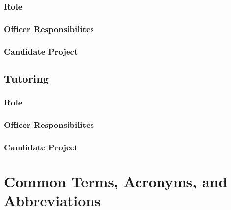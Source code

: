 \documentclass[11pt, article, oneside]{memoir}
\begin{document}
    \subsection{Role}

    \subsection{Officer Responsibilites}

    \subsection{Candidate Project}


    \bigbreak

    
    \section{Tutoring}
    \subsection{Role}

    \subsection{Officer Responsibilites}

    \subsection{Candidate Project}

    
    \bigbreak
    

    \newpage
    \chapter{Common Terms, Acronyms, and Abbreviations}
    
\end{document}
